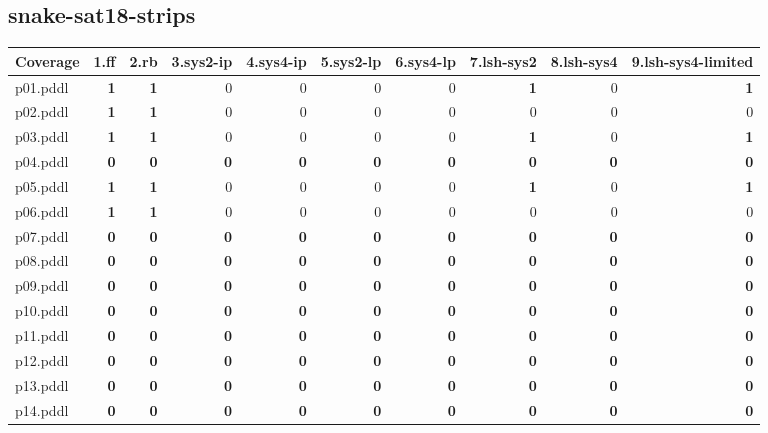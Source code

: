 \documentclass{article}
\begin{document}
\hypertarget{coverage-snake-sat18-strips}{}
\subsection*{snake-sat18-strips}

\begin{tabular}{@{}lrrrrrrrrr@{}}
Coverage & 1.ff & 2.rb & 3.sys2-ip & 4.sys4-ip & 5.sys2-lp & 6.sys4-lp & 7.lsh-sys2 & 8.lsh-sys4 & 9.lsh-sys4-limited \\
\midrule
p01.pddl & \textbf{1} & \textbf{1} & 0 & 0 & 0 & 0 & \textbf{1} & 0 & \textbf{1} \\
p02.pddl & \textbf{1} & \textbf{1} & 0 & 0 & 0 & 0 & 0 & 0 & 0 \\
p03.pddl & \textbf{1} & \textbf{1} & 0 & 0 & 0 & 0 & \textbf{1} & 0 & \textbf{1} \\
p04.pddl & \textbf{0} & \textbf{0} & \textbf{0} & \textbf{0} & \textbf{0} & \textbf{0} & \textbf{0} & \textbf{0} & \textbf{0} \\
p05.pddl & \textbf{1} & \textbf{1} & 0 & 0 & 0 & 0 & \textbf{1} & 0 & \textbf{1} \\
p06.pddl & \textbf{1} & \textbf{1} & 0 & 0 & 0 & 0 & 0 & 0 & 0 \\
p07.pddl & \textbf{0} & \textbf{0} & \textbf{0} & \textbf{0} & \textbf{0} & \textbf{0} & \textbf{0} & \textbf{0} & \textbf{0} \\
p08.pddl & \textbf{0} & \textbf{0} & \textbf{0} & \textbf{0} & \textbf{0} & \textbf{0} & \textbf{0} & \textbf{0} & \textbf{0} \\
p09.pddl & \textbf{0} & \textbf{0} & \textbf{0} & \textbf{0} & \textbf{0} & \textbf{0} & \textbf{0} & \textbf{0} & \textbf{0} \\
p10.pddl & \textbf{0} & \textbf{0} & \textbf{0} & \textbf{0} & \textbf{0} & \textbf{0} & \textbf{0} & \textbf{0} & \textbf{0} \\
p11.pddl & \textbf{0} & \textbf{0} & \textbf{0} & \textbf{0} & \textbf{0} & \textbf{0} & \textbf{0} & \textbf{0} & \textbf{0} \\
p12.pddl & \textbf{0} & \textbf{0} & \textbf{0} & \textbf{0} & \textbf{0} & \textbf{0} & \textbf{0} & \textbf{0} & \textbf{0} \\
p13.pddl & \textbf{0} & \textbf{0} & \textbf{0} & \textbf{0} & \textbf{0} & \textbf{0} & \textbf{0} & \textbf{0} & \textbf{0} \\
p14.pddl & \textbf{0} & \textbf{0} & \textbf{0} & \textbf{0} & \textbf{0} & \textbf{0} & \textbf{0} & \textbf{0} & \textbf{0} \\

\end{tabular}
\end{document}
